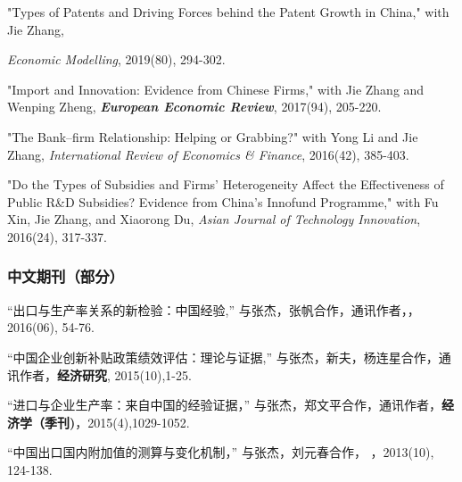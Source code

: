 \documentclass[letterpaper]{article}
\begin{document}
"Types of Patents and Driving Forces behind the Patent Growth in China," with Jie Zhang, {\textit{Economic Modelling}, 2019(80), 294-302.

\vspace{0.5em}
"Import and Innovation: Evidence from Chinese Firms," with Jie Zhang and Wenping Zheng, {\textbf{\textit{European Economic Review}}}, 2017(94), 205-220.

\vspace{0.5em}
"The Bank–firm Relationship: Helping or Grabbing?" with Yong Li and Jie Zhang, {\textit{International Review of Economics \& Finance}}, 2016(42), 385-403.

\vspace{0.5em}
"Do the Types of Subsidies and Firms’ Heterogeneity Affect the Effectiveness of Public R\&D Subsidies? Evidence from China’s Innofund Programme," with Fu Xin, Jie Zhang, and Xiaorong Du, \textit{Asian Journal of Technology Innovation}, 2016(24), 317-337. 

\subsubsection*{中文期刊（部分）}
“出口与生产率关系的新检验：中国经验,” 与张杰，张帆合作，通讯作者，{}，2016(06), 54-76.

\vspace{0.5em}
“中国企业创新补贴政策绩效评估：理论与证据,” 与张杰，新夫，杨连星合作，通讯作者，{\bf 经济研究}, 2015(10),1-25.

\vspace{0.5em}
“进口与企业生产率：来自中国的经验证据，” 与张杰，郑文平合作，通讯作者，{\bf 经济学（季刊)}，2015(4),1029-1052.

\vspace{0.5em}
“中国出口国内附加值的测算与变化机制，” 与张杰，刘元春合作， {}，2013(10), 124-138.

}
\end{document}
